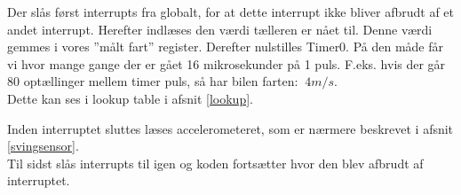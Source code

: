 Der slås først interrupts fra globalt, for at dette interrupt ikke bliver afbrudt af et andet interrupt. Herefter indlæses den værdi tælleren er nået til. Denne værdi gemmes i vores ”målt fart” register. Derefter nulstilles Timer0. På den måde får vi hvor mange gange der er gået 16 mikrosekunder på 1 puls. F.eks. hvis der går 80 optællinger mellem timer puls, så har bilen farten: \(~4 m/s\). \\
Dette kan ses i lookup table i afsnit \ref{lookup}.

Inden interruptet sluttes læses accelerometeret, som er nærmere beskrevet i afsnit \ref{svingsensor}. \\

Til sidst slås interrupts til igen og koden fortsætter hvor den blev afbrudt af interruptet.  

